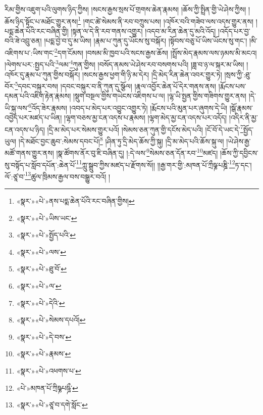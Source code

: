 རིམ་གྱིས་འཇུག་པའི་ལུགས་ཉིད་ཀྱིས། །སངས་རྒྱས་སྲས་པོ་གྲགས་ཆེན་རྣམས། །ཆོས་ཀྱི་སྤྲིན་གྱི་ཡེ་ཤེས་ཀྱིས། །ཆོས་ཉིད་སྟོང་པ་མཐོང་གྱུར་ནས།\footnote{«སྣར་»«པེ་»ནས་པདྨ་ཆེན་པོའི་རང་བཞིན་གྱིས།} །གང་ཚེ་སེམས་ནི་རབ་བཀྲུས་པས། །འཁོར་བའི་གཟེབ་ལས་འདས་གྱུར་ནས། །པདྨ་ཆེན་པོའི་རང་བཞིན་གྱི། །སྟན་ལ་དེ་ནི་རབ་གནས་འགྱུར། །འདབ་མ་རིན་ཆེན་དུ་མའི་འོད། །འདོད་པར་བྱ་བའི་ཟེ་འབྲུ་ཅན། །པདྨ་བྱེ་བ་དུ་མ་ཡིས། །རྣམ་པ་ཀུན་དུ་ཡོངས་སུ་བསྐོར། །སྟོབས་བཅུ་པོ་ཡིས་ཡོངས་སུ་གང་། །མི་འཇིགས་པ་:ཡིས་གང་\footnote{«སྣར་»«པེ་»ཡིས་ཡང་}དག་ངོམས། །བསམ་མི་ཁྱབ་པའི་སངས་རྒྱས་ཆོས། །སྤྲོས་མེད་རྣམས་ལས་ཉམས་མི་མངའ། །ལེགས་པར་:སྤྱད་པའི་\footnote{«སྣར་»«པེ་»སྤྱོད་པའི་}ལམ་\footnote{«སྣར་»«པེ་»ལས་}ཀུན་གྱིས། །བསོད་ནམས་ཡེ་ཤེས་རབ་བསགས་པའི། །ཟླ་བ་ཉ་ལ་སྐར་མ་ཡིས། །འཁོར་དུ་རྣམ་པ་ཀུན་གྱིས་བསྐོར། །སངས་རྒྱས་ཕྱག་གི་ཉི་མ་དེར། །དྲི་མེད་རིན་ཆེན་འབར་གྱུར་ཏེ། །སྲས་ཀྱི་:ཐུ་བོར་\footnote{«སྣར་»«པེ་»ཐུ་བོ་}དབང་བསྐུར་བས། །དབང་བསྐུར་བ་ནི་ཀུན་དུ་སྩོལ། །རྣལ་འབྱོར་ཆེན་པོ་དེར་གནས་ནས། །རྨོངས་པས་དམན་པའི་འཇིག་རྟེན་རྣམས། །སྡུག་བསྔལ་གྱིས་གཡེངས་འཇིགས་པ་ལ། །ལྷ་ཡི་སྤྱན་གྱིས་གཟིགས་གྱུར་ནས། །དེ་ཡི་སྐུ་ལས་\footnote{«སྣར་»«པེ་»ལ་}འོད་ཟེར་རྣམས། །འབད་པ་མེད་པར་འབྱུང་འགྱུར་ཏེ། །རྨོངས་པའི་མུན་པར་ཞུགས་དེ་ཡི། །སྒོ་རྣམས་འབྱེད་པར་མཛད་པ་ཡིན། །ལྷག་བཅས་མྱ་ངན་འདས་པ་རྣམས། །ལྷག་མེད་མྱ་ངན་འདས་པར་འདོད། །འདིར་ནི་མྱ་ངན་འདས་པ་ཉིད། །དྲི་མ་མེད་པར་སེམས་གྱུར་པའོ། །སེམས་ཅན་ཀུན་གྱི་དངོས་མེད་པའི། །ངོ་བོ་དེ་ཡང་དེ་\footnote{«སྣར་»«པེ་»དེའི་}སྤྱོད་ཡུལ། །དེ་མཐོང་བྱང་ཆུབ་:སེམས་དབང་པོ།\footnote{«སྣར་»«པེ་»སེམས་དཔའོ།} །ཤིན་ཏུ་དྲི་མེད་ཆོས་ཀྱི་སྐུ། །དྲི་མ་མེད་པའི་ཆོས་སྐུ་ལ། །ཡེ་ཤེས་རྒྱ་མཚོ་གནས་གྱུར་ནས། །སྣ་ཚོགས་ནོར་བུ་ཇི་བཞིན་དུ། །:དེ་ལས་\footnote{«སྣར་»«པེ་»དེ་བས་}སེམས་ཅན་དོན་རབ་\footnote{«སྣར་»«པེ་»རྣམས་}མཛད། །ཆོས་ཀྱི་དབྱིངས་སུ་བསྟོད་པ་སློབ་དཔོན་:ཆེན་པོ་\footnote{«སྣར་»«པེ་»འཕགས་པ་}ཀླུ་སྒྲུབ་ཀྱིས་མཛད་པ་རྫོགས་སོ།། །།རྒྱ་གར་གྱི་:མཁན་པོ་ཀྲྀཥྞ་པཎྜི་\footnote{«པེ་»མཁན་པོ་ཀྲིཥྞཔཥྜྀ་}ཏ་དང་། ལོ་:ཙཱ་བ་\footnote{«སྣར་»«པེ་»ཙཱ་བ་དགེ་སློང་}ཚུལ་ཁྲིམས་རྒྱལ་བས་བསྒྱུར་བའོ། ། 